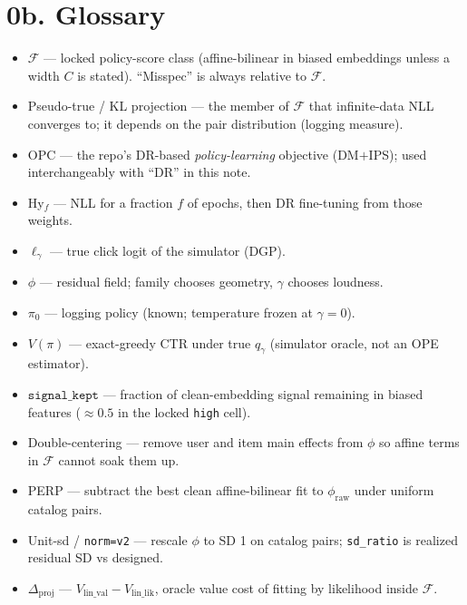 \documentclass[11pt]{article}
\newcommand{\phonesection}[1]{\Needspace{8\baselineskip}\section*{#1}}
\newcommand{\Dproj}{\Delta_{\mathrm{proj}}}
\begin{document}
\phonesection{0b. Glossary}

\begin{itemize}
  \item $\mathcal{F}$ --- locked policy-score
        class (affine-bilinear in biased
        embeddings unless a width $C$ is
        stated).  ``Misspec'' is always
        relative to $\mathcal{F}$.
  \item Pseudo-true / KL projection ---
        the member of $\mathcal{F}$ that
        infinite-data NLL converges to; it
        depends on the pair distribution
        (logging measure).
  \item OPC --- the repo's DR-based
        \emph{policy-learning} objective
        (DM$+$IPS); used interchangeably
        with ``DR'' in this note.
  \item Hy$_f$ --- NLL for a fraction $f$
        of epochs, then DR fine-tuning
        from those weights.
  \item $\ell_{\gamma}$ --- true click logit
        of the simulator (DGP).
  \item $\phi$ --- residual field; family
        chooses geometry, $\gamma$ chooses
        loudness.
  \item $\pi_{0}$ --- logging policy
        (known; temperature frozen at
        $\gamma{=}0$).
  \item $V(\pi)$ --- exact-greedy CTR under
        true $q_{\gamma}$ (simulator oracle,
        not an OPE estimator).
  \item $\texttt{signal\_kept}$ --- fraction
        of clean-embedding signal remaining
        in biased features ($\approx 0.5$ in
        the locked \texttt{high} cell).
  \item Double-centering --- remove user
        and item main effects from $\phi$
        so affine terms in $\mathcal{F}$
        cannot soak them up.
  \item PERP --- subtract the best clean
        affine-bilinear fit to
        $\phi_{\mathrm{raw}}$ under uniform
        catalog pairs.
  \item Unit-sd / \texttt{norm=v2} ---
        rescale $\phi$ to SD 1 on catalog
        pairs; \texttt{sd\_ratio} is realized
        residual SD vs designed.
  \item $\Dproj$ ---
        $V_{\mathrm{lin\_val}}-V_{\mathrm{lin\_lik}}$,
        oracle value cost of fitting by
        likelihood inside $\mathcal{F}$.

\end{itemize}
\end{document}
